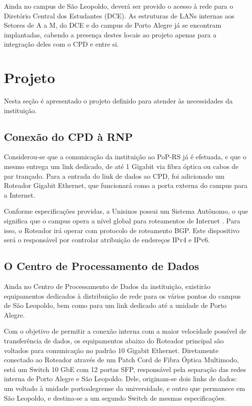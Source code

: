 \documentclass[12pt]{article}
\begin{document}
Ainda no campus de São Leopoldo, deverá ser provido o acesso à rede para o Diretório Central dos Estudantes (DCE). As estruturas de LANs internas aos Setores de A a M, do DCE e do campus de Porto Alegre já se encontram implantadas, cabendo a presença destes locais ao projeto apenas para a integração deles com o CPD e entre si.

\section{Projeto} \label{sec:projeto}
Nesta seção é apresentado o projeto definido para atender às necessidades da instituição.

\subsection{Conexão do CPD à RNP}
Considerou-se que a comunicação da instituição ao PoP-RS já é efetuada, e que o mesmo entrega um link dedicado, de até 1 Gigabit via fibra óptica ou cabos de par trançado. Para a entrada do link de dados ao CPD, foi adicionado um Roteador Gigabit Ethernet, que funcionará como a porta externa do campus para a Internet.

Conforme especificações providas, a Unisinos possui um Sistema Autônomo, o que significa que o campus opera a nível global para roteamentos de Internet \cite{dbip}. Para isso, o Roteador irá operar com protocolo de roteamento BGP. Este dispositivo será o responsável por controlar atribuição de endereços IPv4 e IPv6.

\subsection{O Centro de Processamento de Dados}
Ainda no Centro de Processamento de Dados da instituição, existirão equipamentos dedicados à distribuição de rede para os vários pontos do campus de São Leopoldo, bem como para um link dedicado até a unidade de Porto Alegre.

Com o objetivo de permitir a conexão interna com a maior velocidade possível de transferência de dados, os equipamentos abaixo do Roteador principal são voltados para comunicação no padrão 10 Gigabit Ethernet. Diretamente conectado ao Roteador através de um Patch Cord de Fibra Óptica Multimodo, está um Switch 10 GbE com 12 portas SFP, responsável pela separação das redes interna de Porto Alegre e São Leopoldo. Dele, originam-se dois links de dados: um voltado à unidade portoalegrense da universidade, e outro que permanece em São Leopoldo, e destina-se a um segundo Switch de mesmas especificações.
\end{document}
